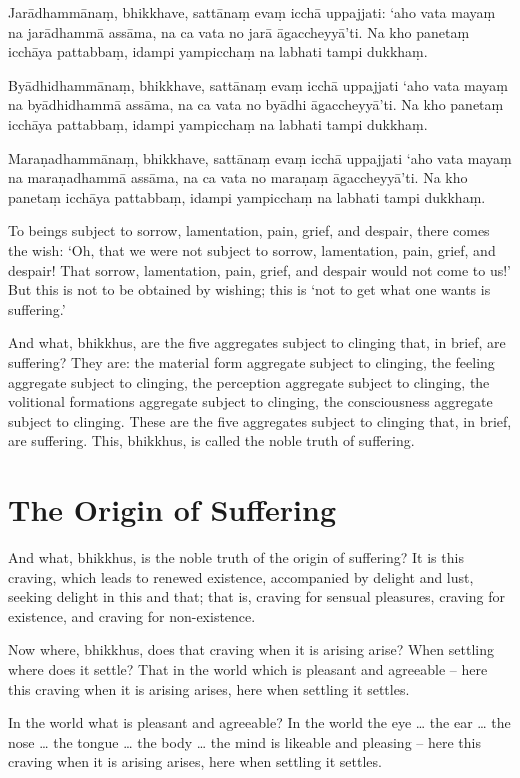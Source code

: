 Jarādhammānaṃ, bhikkhave, sattānaṃ evaṃ icchā uppajjati: ‘aho vata mayaṃ na
jarādhammā assāma, na ca vata no jarā āgaccheyyā’ti. Na kho panetaṃ icchāya
pattabbaṃ, idampi yampicchaṃ na labhati tampi dukkhaṃ.

Byādhidhammānaṃ, bhikkhave, sattānaṃ evaṃ icchā uppajjati ‘aho vata mayaṃ na
byādhidhammā assāma, na ca vata no byādhi āgaccheyyā’ti. Na kho panetaṃ icchāya
pattabbaṃ, idampi yampicchaṃ na labhati tampi dukkhaṃ.

Maraṇadhammānaṃ, bhikkhave, sattānaṃ evaṃ icchā uppajjati ‘aho vata mayaṃ na
maraṇadhammā assāma, na ca vata no maraṇaṃ āgaccheyyā’ti. Na kho panetaṃ icchāya
pattabbaṃ, idampi yampicchaṃ na labhati tampi dukkhaṃ.

\englishPage

To beings subject to sorrow, lamentation, pain, grief, and despair, there comes
the wish: `Oh, that we were not subject to sorrow, lamentation, pain, grief, and
despair! That sorrow, lamentation, pain, grief, and despair would not come to
us!' But this is not to be obtained by wishing; this is `not to get what one
wants is suffering.'

And what, bhikkhus, are the five aggregates subject to clinging that, in brief,
are suffering? They are: the material form aggregate subject to clinging, the
feeling aggregate subject to clinging, the perception aggregate subject to
clinging, the volitional formations aggregate subject to clinging, the
consciousness aggregate subject to clinging. These are the five aggregates
subject to clinging that, in brief, are suffering. This, bhikkhus, is called the
noble truth of suffering.

\section{The Origin of Suffering}

And what, bhikkhus, is the noble truth of the origin of suffering? It is this
craving, which leads to renewed existence, accompanied by delight and lust,
seeking delight in this and that; that is, craving for sensual pleasures,
craving for existence, and craving for non-existence.

Now where, bhikkhus, does that craving when it is arising arise? When settling
where does it settle? That in the world which is pleasant and agreeable -- here
this craving when it is arising arises, here when settling it settles.

In the world what is pleasant and agreeable? In the world the eye \ldots{} the
ear \ldots{} the nose \ldots{} the tongue \ldots{} the body \ldots{} the mind is
likeable and pleasing -- here this craving when it is arising arises, here when
settling it settles.

